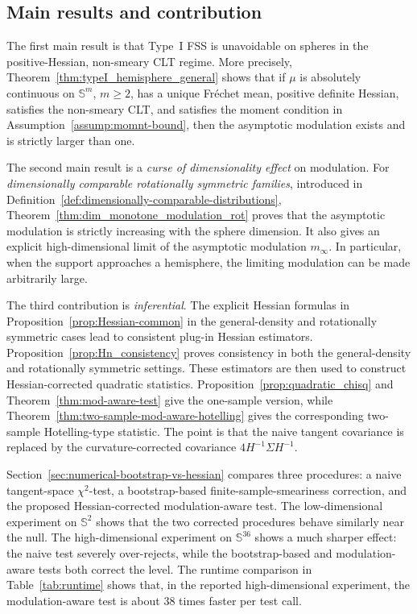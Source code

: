 \documentclass{amsart}
\theoremstyle{definition}
\theoremstyle{remark}
\newcommand\0{\boldsymbol{0}}
\begin{document}
\subsection{Main results and contribution}
\label{subsec:intro-main-results}

The first main result is that Type~I FSS is unavoidable on spheres in the positive-Hessian, non-smeary CLT regime.  More precisely, Theorem~\ref{thm:typeI_hemisphere_general} shows that if \(\mu\) is absolutely continuous on \(\mathbb S^m\), \(m\ge2\), has a unique Fr\'echet mean, positive definite Hessian, satisfies the non-smeary CLT, and satisfies the moment condition in Assumption~\ref{assump:momnt-bound}, then the asymptotic modulation exists and is strictly larger than one.  

The second main result is a \textit{curse of dimensionality effect} on modulation.  For \textit{dimensionally comparable rotationally symmetric families}, introduced in Definition~\ref{def:dimensionally-comparable-distributions}, Theorem~\ref{thm:dim_monotone_modulation_rot} proves that the asymptotic modulation is strictly increasing with the sphere dimension.  It also gives an explicit high-dimensional limit of the asymptotic modulation $m_{\infty}$.  In particular, when the support approaches a hemisphere, the limiting modulation can be made arbitrarily large. 

The third contribution is \textit{inferential}.  The explicit Hessian formulas in Proposition~\ref{prop:Hessian-common} in the general-density and rotationally symmetric cases lead to consistent plug-in Hessian estimators.  Proposition~\ref{prop:Hn_consistency} proves consistency in both the general-density and rotationally symmetric settings.  These estimators are then used to construct Hessian-corrected quadratic statistics.  Proposition~\ref{prop:quadratic_chisq} and Theorem~\ref{thm:mod-aware-test} give the one-sample version, while Theorem~\ref{thm:two-sample-mod-aware-hotelling} gives the corresponding two-sample Hotelling-type statistic.  The point is that the naive tangent covariance is replaced by the curvature-corrected covariance \(4H^{-1}\Sigma H^{-1}\).

Section~\ref{sec:numerical-bootstrap-vs-hessian} compares three procedures: a naive tangent-space \(\chi^2\)-test, a bootstrap-based finite-sample-smeariness correction, and the proposed Hessian-corrected modulation-aware test.  The low-dimensional experiment on \(\mathbb S^2\) shows that the two corrected procedures behave similarly near the null.  The high-dimensional experiment on \(\mathbb S^{36}\) shows a much sharper effect: the naive test severely over-rejects, while the bootstrap-based and modulation-aware tests both correct the level.  The runtime comparison in Table~\ref{tab:runtime} shows that, in the reported high-dimensional experiment, the modulation-aware test is about \(38\) times faster per test call.
\end{document}
